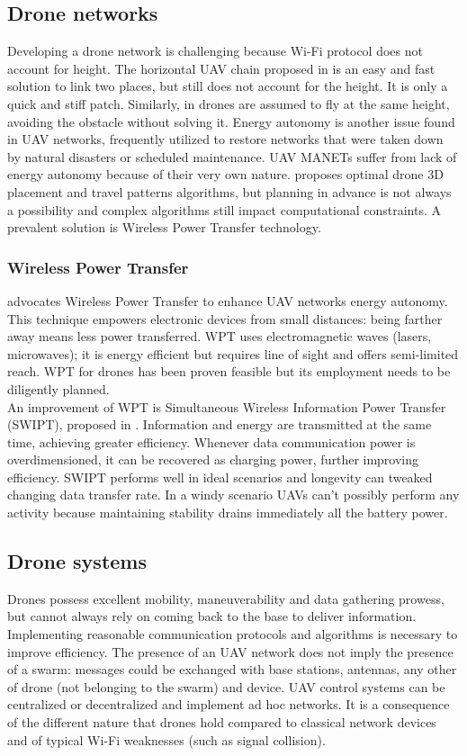 \documentclass[journal]{IEEEtran}
\begin{document}
\subsection{Drone networks}
Developing a drone network is challenging because Wi-Fi protocol does not account for height. The horizontal UAV chain proposed in \cite{horswarm} is an easy and fast solution to link two places, but still does not account for the height. It is only a quick and stiff patch. Similarly, in \cite{swarmtrack} drones are assumed to fly at the same height, avoiding the obstacle without solving it. Energy autonomy is another issue found in UAV networks, frequently utilized to restore networks that were taken down by natural disasters or scheduled maintenance. UAV MANETs suffer from lack of energy autonomy because of their very own nature. \cite{autonom} proposes optimal drone 3D placement and travel patterns algorithms, but planning in advance is not always a possibility and complex algorithms still impact computational constraints. A prevalent solution is Wireless Power Transfer technology.

\subsubsection{Wireless Power Transfer}
\cite{autonom} advocates Wireless Power Transfer \cite{wpt} to enhance UAV networks energy autonomy. This technique empowers electronic devices from small distances: being farther away means less power transferred. WPT uses electromagnetic waves (lasers, microwaves); it is energy efficient but requires line of sight and offers semi-limited reach. WPT for drones  has been proven feasible but its employment needs to be diligently planned.
\\
An improvement of WPT is Simultaneous Wireless Information Power Transfer (SWIPT), proposed in \cite{powertransf}. Information and energy are transmitted at the same time, achieving greater efficiency. Whenever data communication power is overdimensioned, it can be recovered as charging power, further improving efficiency. SWIPT performs well in ideal scenarios and longevity can tweaked changing data transfer rate. In a windy scenario UAVs can't possibly perform any activity because maintaining stability drains immediately all the battery power.


\subsection{Drone systems}
Drones possess excellent mobility, maneuverability and data gathering prowess, but cannot always rely on coming back to the base to deliver information. Implementing reasonable communication protocols and algorithms is necessary to improve efficiency. The presence of an UAV network does not imply the presence of a swarm: messages could be exchanged with base stations, antennas, any other of drone (not belonging to the swarm) and device. UAV control systems can be centralized or decentralized and implement ad hoc networks. It is a consequence of the different nature that drones hold compared to classical network devices and of typical Wi-Fi weaknesses (such as signal collision).
\end{document}
